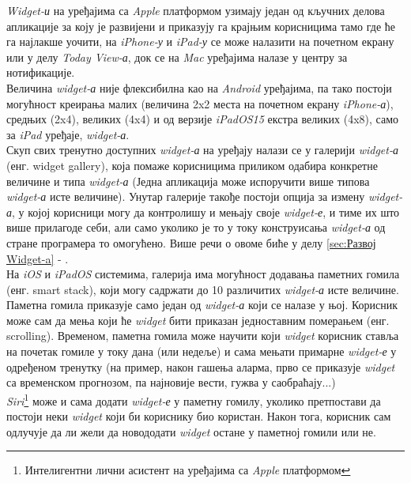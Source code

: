 \documentclass[12pt,oneside]{memoir}
\begin{document}
\indent \textit{Widget-и} на уређајима са \textit{Apple} платформом узимају један од кључних делова апликације за коју је развијени и приказују га крајњим корисницима тамо где ће га најлакше уочити, на \textit{iPhone-у} и \textit{iPad-у} се може налазити на почетном екрану или у делу \textit{Today View-а}, док се на \textit{Mac} уређајима налазе у центру за нотификације.
\\
\indent Величина \textit{widget-а} није флексибилна као на \textit{Android} уређајима, па тако постоји могућност креирања малих (величина 2x2 места на почетном екрану \textit{iPhone-а}), средњих (2x4), великих (4x4) и од верзије \textit{iPadOS15} екстра великих (4x8), само за \textit{iPad} уређаје, \textit{widget-а}. 
\\
\indent Скуп свих тренутно доступних \textit{widget-а} на уређају налази се у галерији \textit{widget-а} (енг. widget gallery), која помаже корисницима приликом одабира конкретне величине и типа \textit{widget-а} (Једна апликација може испоручити више типова \textit{widget-а} исте величине). Унутар галерије такође постоји опција за измену \textit{widget-а}, у којој корисници могу да контролишу и мењају своје \textit{widget-е}, и тиме их што више прилагоде себи, али само уколико је то у току конструисања \textit{widget-а} од стране програмера то омогућено. Више речи о овоме биће у делу \ref{sec:Развој Widget-a} - .
\\
\indent На \textit{iOS} и \textit{iPadOS} системима, галерија има могућност додавања паметних гомила (енг. smart stack), који могу садржати до 10 различитих \textit{widget-а} исте величине. Паметна гомила приказује само један од \textit{widget-а} који се налазе у њој. Корисник може сам да мења који ће \textit{widget} бити приказан једноставним померањем (енг. scrolling). Временом, паметна гомила може научити који \textit{widget} корисник ставља на почетак гомиле у току дана (или недеље) и сама мењати примарне \textit{widget-е} у одређеном тренутку (на пример, након гашења аларма, прво се приказује \textit{widget} са временском прогнозом, па најновије вести, гужва у саобраћају...)
\\
\indent \textit{Siri}\footnote{Интелигентни лични асистент на уређајима са \textit{Apple} платформом} може и сама додати \textit{widget-е} у паметну гомилу, уколико претпостави да постоји неки \textit{widget} који би кориснику био користан. Након тога, корисник сам одлучује да ли жели да новододати \textit{widget} остане у паметној гомили или не.
\end{document}
